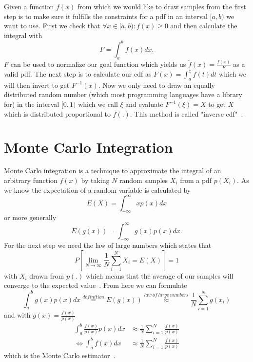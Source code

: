 Given a function $ f(x) $ from which we would like to draw samples from the first step is to make sure
it fulfills the constraints for a pdf in an interval $ [a, b) $ we want to use.
First we check that $ \forall x \in [a, b): f(x) \geq 0 $ and then calculate the integral with
\begin{equation}
\label{eq:integral_fx}
    F = \int_{a}^b f(x) dx.
\end{equation}
$ F $ can be used to normalize our goal function which yields us $ \tilde{f}(x) = \frac{f(x)}{F} $ as a valid pdf.
The next step is to calculate our cdf as $ F(x) = \int_{a}^x \tilde{f}(t) dt $ which we will then invert to get $ F^{-1}(x) $.
Now we only need to draw an equally distributed random number (which most programming languages have a library for) in the interval $ [0, 1) $
which we call $ \xi $ and evaluate $ F^{-1}(\xi) = X $ to get $ X $ which is distributed proportional to $ f(.) $.
This method is called "inverse cdf"~\cite{pris}.



\section{Monte Carlo Integration}
\label{sec:monte_carlo}
Monte Carlo integration is a technique to approximate the integral of an arbitrary function $ f(x) $
by taking $ N $ random samples $ X_i $ from a pdf $ p(X_i) $.
As we know the expectation of a random variable is calculated by $$ E(X) = \int_{-\infty}^\infty x p(x) dx $$
or more generally $$ E(g(x)) = \int_{-\infty}^\infty g(x) p(x) dx. $$
For the next step we need the law of large numbers which states that $$ P\left[ \lim_{N\to\infty} \frac{1}{N} \sum_{i = 1}^N X_i = E(X) \right] = 1 $$
with $ X_i $ drawn from $ p(.) $ which means that the average of our samples will converge to the expected value~\cite[Chapter~2.4.1]{veach-thesis}.
From here we can formulate
\begin{equation*}
    \int_{a}^b g(x) p(x) dx \stackrel{definition}{=} E(g(x))
    \stackrel{law~of~large~numbers}{\approx} \frac{1}{N} \sum_{i = 1}^N g(x_i)
\end{equation*}
and with $ g(x) = \frac{f(x)}{p(x)} $
\begin{equation}
\label{eq:monte_carlo_integral}
\begin{aligned}
    \int_{a}^b \frac{f(x)}{p(x)} p(x) dx &\approx \frac{1}{N} \sum_{i = 1}^N \frac{f(x)}{p(x)} \\
    \Leftrightarrow \int_{a}^b f(x) dx &\approx \frac{1}{N} \sum_{i = 1}^N \frac{f(x)}{p(x)}
\end{aligned}
\end{equation}
which is the Monte Carlo estimator~\cite{pris}.


